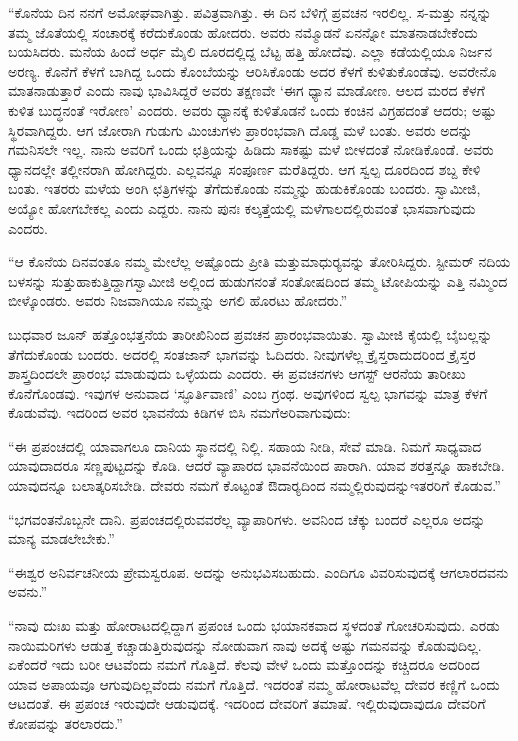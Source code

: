  “ಕೊನೆಯ ದಿನ ನನಗೆ ಅಮೋಘವಾಗಿತ್ತು. ಪವಿತ್ರವಾಗಿತ್ತು. ಈ ದಿನ ಬೆಳಿಗ್ಗೆ ಪ್ರವಚನ ಇರಲಿಲ್ಲ. ಸ-ಮತ್ತು ನನ್ನನ್ನು ತಮ್ಮ ಜೊತೆಯಲ್ಲಿ ಸಂಚಾರಕ್ಕೆ ಕರೆದುಕೊಂಡು ಹೋದರು. ಅವರು ನಮ್ಮೊಡನೆ ಏನನ್ನೋ ಮಾತನಾಡಬೇಕೆಂದು ಬಯಸಿದರು. ಮನೆಯ ಹಿಂದೆ ಅರ್ಧ ಮೈಲಿ ದೂರದಲ್ಲಿದ್ದ ಬೆಟ್ಟ ಹತ್ತಿ ಹೋದೆವು. ಎಲ್ಲಾ ಕಡೆಯಲ್ಲಿಯೂ ನಿರ್ಜನ ಅರಣ್ಯ. ಕೊನೆಗೆ ಕೆಳಗೆ ಬಾಗಿದ್ದ ಒಂದು ಕೊಂಬೆಯನ್ನು ಆರಿಸಿಕೊಂಡು ಅದರ ಕೆಳಗೆ ಕುಳಿತುಕೊಂಡೆವು. ಅವರೇನೊ ಮಾತನಾಡುತ್ತಾರೆ ಎಂದು ನಾವು ಭಾವಿಸಿದ್ದರೆ ಅವರು ತಕ್ಷಣವೇ ‘ಈಗ ಧ್ಯಾನ ಮಾಡೋಣ. ಆಲದ ಮರದ ಕೆಳಗೆ ಕುಳಿತ ಬುದ್ಧನಂತೆ ಇರೋಣ’ ಎಂದರು. ಅವರು ಧ್ಯಾನಕ್ಕೆ ಕುಳಿತೊಡನೆ ಒಂದು ಕಂಚಿನ ವಿಗ್ರಹದಂತೆ ಆದರು; ಅಷ್ಟು ಸ್ಥಿರವಾಗಿದ್ದರು. ಆಗ ಜೋರಾಗಿ ಗುಡುಗು ಮಿಂಚುಗಳು ಪ್ರಾರಂಭವಾಗಿ ದೊಡ್ಡ ಮಳೆ ಬಂತು. ಅವರು ಅದನ್ನು ಗಮನಿಸಲೇ ಇಲ್ಲ. ನಾನು ಅವರಿಗೆ ಒಂದು ಛತ್ರಿಯನ್ನು ಹಿಡಿದು ಸಾಕಷ್ಟು ಮಳೆ ಬೀಳದಂತೆ ನೋಡಿಕೊಂಡೆ. ಅವರು ಧ್ಯಾನದಲ್ಲೇ ತಲ್ಲೀನರಾಗಿ ಹೋಗಿದ್ದರು. ಎಲ್ಲವನ್ನೂ ಸಂಪೂರ್ಣ ಮರೆತಿದ್ದರು. ಆಗ ಸ್ವಲ್ಪ ದೂರದಿಂದ ಶಬ್ದ ಕೇಳಿ ಬಂತು. ಇತರರು ಮಳೆಯ ಅಂಗಿ ಛತ್ರಿಗಳನ್ನು ತೆಗೆದುಕೊಂಡು ನಮ್ಮನ್ನು ಹುಡುಕಿಕೊಂಡು ಬಂದರು. ಸ್ವಾಮೀಜಿ, ಅಯ್ಯೋ ಹೋಗಬೇಕಲ್ಲ ಎಂದು ಎದ್ದರು. ನಾನು ಪುನಃ ಕಲ್ಕತ್ತೆಯಲ್ಲಿ ಮಳೆಗಾಲದಲ್ಲಿರುವಂತೆ ಭಾಸವಾಗುವುದು ಎಂದರು.

 “ಆ ಕೊನೆಯ ದಿನವಂತೂ ನಮ್ಮ ಮೇಲೆಲ್ಲ ಅಷ್ಟೊಂದು ಪ್ರೀತಿ ಮತ್ತು\break ಮಾಧುರ‍್ಯವನ್ನು ತೋರಿಸಿದ್ದರು. ಸ್ಟೀಮರ್ ನದಿಯ ಬಳಸನ್ನು ಸುತ್ತುಹಾಕುತ್ತಿದ್ದಾಗ\break ಸ್ವಾಮೀಜಿ ಅಲ್ಲಿಂದ ಹುಡುಗನಂತೆ ಸಂತೋಷದಿಂದ ತಮ್ಮ ಟೋಪಿಯನ್ನು ಎತ್ತಿ ನಮ್ಮಿಂದ ಬೀಳ್ಕೊಂಡರು. ಅವರು ನಿಜವಾಗಿಯೂ ನಮ್ಮನ್ನು ಅಗಲಿ ಹೊರಟು ಹೋದರು.”

\delimiter

\vskip -8pt

 ಬುಧವಾರ ಜೂನ್ ಹತ್ತೊಂಭತ್ತನೆಯ ತಾರೀಖಿನಿಂದ ಪ್ರವಚನ ಪ್ರಾರಂಭವಾಯಿತು. ಸ್ವಾಮೀಜಿ ಕೈಯಲ್ಲಿ ಬೈಬಲ್ಲನ್ನು ತೆಗೆದುಕೊಂಡು ಬಂದರು. ಅದರಲ್ಲಿ ಸಂತಜಾನ್ ಭಾಗವನ್ನು ಓದಿದರು. ನೀವುಗಳೆಲ್ಲ ಕ್ರೈಸ್ತರಾದುದರಿಂದ ಕ್ರೈಸ್ತರ ಶಾಸ್ತ್ರದಿಂದಲೇ ಪ್ರಾರಂಭ ಮಾಡುವುದು ಒಳ್ಳೆಯದು ಎಂದರು. ಈ ಪ್ರವಚನಗಳು ಆಗಸ್ಟ್ ಆರನೆಯ ತಾರೀಖು ಕೊನೆಗೊಂಡವು. ಇವುಗಳ ಅನುವಾದ ‘ಸ್ಫೂರ್ತಿವಾಣಿ’ ಎಂಬ ಗ್ರಂಥ. ಅವುಗಳಿಂದ ಸ್ವಲ್ಪ ಭಾಗವನ್ನು ಮಾತ್ರ ಕೆಳಗೆ ಕೊಡುವೆವು. ಇದರಿಂದ ಅವರ ಭಾವನೆಯ ಕಿಡಿಗಳ ಬಿಸಿ ನಮಗೆ\break ಅರಿವಾಗುವುದು:

 “ಈ ಪ್ರಪಂಚದಲ್ಲಿ ಯಾವಾಗಲೂ ದಾನಿಯ ಸ್ಥಾನದಲ್ಲಿ ನಿಲ್ಲಿ. ಸಹಾಯ ನೀಡಿ, ಸೇವೆ ಮಾಡಿ. ನಿಮಗೆ ಸಾಧ್ಯವಾದ ಯಾವುದಾದರೂ ಸಣ್ಣಪುಟ್ಟದನ್ನು ಕೊಡಿ. ಆದರೆ ವ್ಯಾಪಾರದ ಭಾವನೆಯಿಂದ ಪಾರಾಗಿ. ಯಾವ ಶರತ್ತನ್ನೂ ಹಾಕಬೇಡಿ. ಯಾವುದನ್ನೂ ಬಲಾತ್ಕರಿಸಬೇಡಿ. ದೇವರು ನಮಗೆ ಕೊಟ್ಟಂತೆ ಔದಾರ‍್ಯದಿಂದ ನಮ್ಮಲ್ಲಿರುವುದನ್ನು\break ಇತರರಿಗೆ ಕೊಡುವ.” 

 “ಭಗವಂತನೊಬ್ಬನೇ ದಾನಿ. ಪ್ರಪಂಚದಲ್ಲಿರುವವರೆಲ್ಲ ವ್ಯಾಪಾರಿಗಳು. ಅವನಿಂದ ಚೆಕ್ಕು ಬಂದರೆ ಎಲ್ಲರೂ ಅದನ್ನು ಮಾನ್ಯ ಮಾಡಲೇಬೇಕು.” 

 “ಈಶ್ವರ ಅನಿರ್ವಚನೀಯ ಪ್ರೇಮಸ್ವರೂಪ. ಅದನ್ನು ಅನುಭವಿಸಬಹುದು. ಎಂದಿಗೂ ವಿವರಿಸುವುದಕ್ಕೆ ಆಗಲಾರದವನು ಅವನು.” 

 “ನಾವು ದುಃಖ ಮತ್ತು ಹೋರಾಟದಲ್ಲಿದ್ದಾಗ ಪ್ರಪಂಚ ಒಂದು ಭಯಾನಕವಾದ ಸ್ಥಳದಂತೆ ಗೋಚರಿಸುವುದು. ಎರಡು ನಾಯಿಮರಿಗಳು ಆಡುತ್ತ ಕಚ್ಚಾಡುತ್ತಿರುವುದನ್ನು ನೋಡುವಾಗ ನಾವು ಅದಕ್ಕೆ ಅಷ್ಟು ಗಮನವನ್ನು ಕೊಡುವುದಿಲ್ಲ. ಏಕೆಂದರೆ ಇದು ಬರೀ ಆಟವೆಂದು ನಮಗೆ ಗೊತ್ತಿದೆ. ಕೆಲವು ವೇಳೆ ಒಂದು ಮತ್ತೊಂದನ್ನು ಕಚ್ಚಿದರೂ ಅದರಿಂದ ಯಾವ ಅಪಾಯವೂ ಆಗುವುದಿಲ್ಲವೆಂದು ನಮಗೆ ಗೊತ್ತಿದೆ. ಇದರಂತೆ ನಮ್ಮ ಹೋರಾಟವೆಲ್ಲ ದೇವರ ಕಣ್ಣಿಗೆ ಒಂದು ಆಟದಂತೆ. ಈ ಪ್ರಪಂಚ ಇರುವುದೇ ಆಡುವುದಕ್ಕೆ. ಇದರಿಂದ ದೇವರಿಗೆ ತಮಾಷೆ. ಇಲ್ಲಿರುವುದಾವುದೂ ದೇವರಿಗೆ ಕೋಪವನ್ನು ತರಲಾರದು.” 

